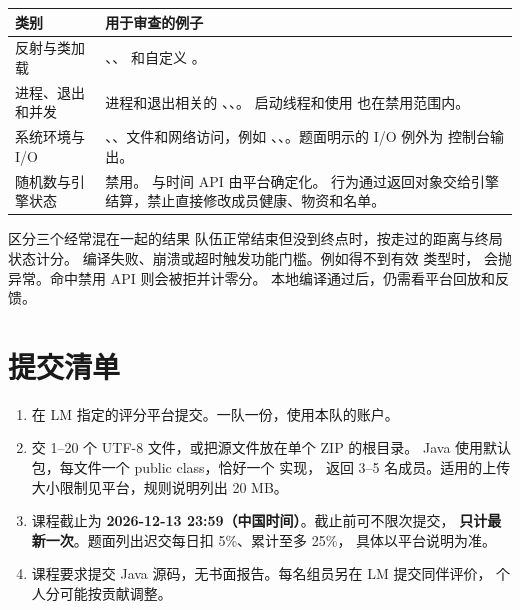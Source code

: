 \documentclass[UTF8,11pt,a4paper]{ctexart}
\begin{document}
\begin{center}\small
\begin{tabularx}{\linewidth}{@{}L{3.45cm}Y@{}}
\toprule
类别 & 用于审查的例子 \\
\midrule
反射与类加载 &
、、 和自定义 。 \\
进程、退出和并发 &
进程和退出相关的 、、。
\newline 启动线程和使用  也在禁用范围内。 \\
系统环境与 I/O &
、、文件和网络访问，例如
、、。题面明示的 I/O 例外为  控制台输出。 \\
随机数与引擎状态 &
 禁用。 与时间 API 由平台确定化。
行为通过返回对象交给引擎结算，禁止直接修改成员健康、物资和名单。 \\
\bottomrule
\end{tabularx}
\end{center}

\begin{keybox}{区分三个经常混在一起的结果}
队伍正常结束但没到终点时，按走过的距离与终局状态计分。
编译失败、崩溃或超时触发功能门槛。例如得不到有效  类型时，
 会抛异常。命中禁用 API 则会被拒并计零分。
本地编译通过后，仍需看平台回放和反馈。  
\end{keybox}

\clearpage

\section{提交清单}

\begin{enumerate}
  \item 在 LM 指定的评分平台提交。一队一份，使用本队的账户。
  \item 交 1--20 个 UTF-8  文件，或把源文件放在单个 ZIP 的根目录。
  Java 使用默认包，每文件一个 public class，恰好一个  实现，
  返回 3--5 名成员。适用的上传大小限制见平台，规则说明列出 20 MB。
  \item 课程截止为 \textbf{2026-12-13 23:59（中国时间）}。截止前可不限次提交，
  \textbf{只计最新一次}。题面列出迟交每日扣 5\%、累计至多 25\%，
  具体以平台说明为准。
  \item 课程要求提交 Java 源码，无书面报告。每名组员另在 LM 提交同伴评价，
  个人分可能按贡献调整。  
\end{enumerate}
\end{document}
